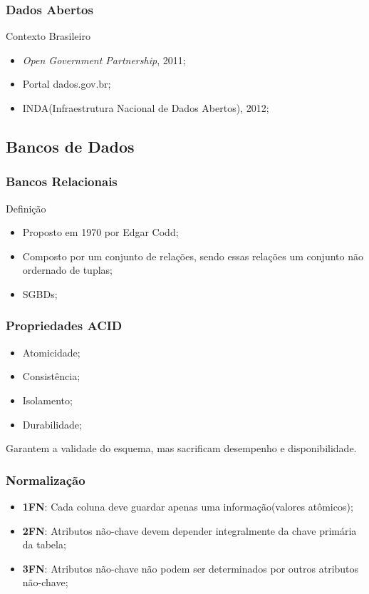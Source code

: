 \documentclass[brazil]{beamer}
\begin{document}
\begin{frame}
	\frametitle{Dados Abertos}
	\begin{block}{Contexto Brasileiro}
		\begin{itemize}
			\item \emph{Open Government Partnership}, 2011;
			\item Portal dados.gov.br;
			\item INDA(Infraestrutura Nacional de Dados Abertos), 2012;			
		\end{itemize}
	\end{block}
\end{frame}


\subsection{Bancos de Dados}

\begin{frame}
\frametitle{Bancos Relacionais}
	\begin{block}{Definição}
		\begin{itemize}
			\item Proposto em 1970 por Edgar Codd;
			\item Composto por um conjunto de relações, sendo essas relações um conjunto não ordernado de tuplas;
			\item SGBDs;
		\end{itemize}
	\end{block}
\end{frame}

\begin{frame}
\frametitle{Propriedades ACID}
	\begin{itemize}
		\item Atomicidade;
		\item Consistência;
		\item Isolamento;
		\item Durabilidade;
	\end{itemize}
	Garantem a validade do esquema, mas sacrificam desempenho e disponibilidade.
\end{frame}


\begin{frame}
\frametitle{Normalização}
	\begin{itemize}
		\item \textbf{1FN}: Cada coluna deve guardar apenas uma informação(valores atômicos);
		\item \textbf{2FN}: Atributos não-chave devem depender integralmente da chave primária da tabela;
		\item \textbf{3FN}: Atributos não-chave não podem ser determinados por outros atributos não-chave; 
	\end{itemize}
\end{frame}
\end{document}
